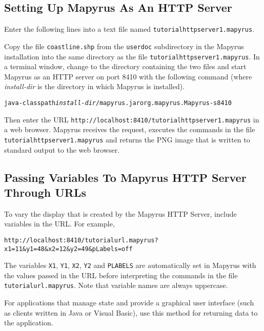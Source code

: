 \subsection{Setting Up Mapyrus As An HTTP Server}
\label{tutorialhttpserver}

Enter the following lines into a text file named
\texttt{tutorialhttpserver1.mapyrus}.



Copy the file \texttt{coastline.shp} from the \texttt{userdoc}
subdirectory in the
Mapyrus installation into the same directory as the file
\texttt{tutorialhttpserver1.mapyrus}.  In a terminal window, change to the
directory containing the two files and start Mapyrus as an HTTP server on port
8410 with the following command
(where \textit{install-dir} is the directory in which Mapyrus is installed).

\begin{alltt}
java -classpath \textit{install-dir}/mapyrus.jar org.mapyrus.Mapyrus -s 8410
\end{alltt}

Then enter the URL \texttt{http://localhost:8410/tutorialhttpserver1.mapyrus} in a
web browser.  Mapyrus receives the request, executes the commands in the file
\texttt{tutorialhttpserver1.mapyrus} and returns the PNG image that is written to
standard output to the web browser.

\subsection{Passing Variables To Mapyrus HTTP Server Through URLs}

To vary the display that is created by the Mapyrus HTTP Server, include
variables in the URL.  For example,

\begin{verbatim}
http://localhost:8410/tutorialurl.mapyrus?x1=11&y1=48&x2=12&y2=49&pLabels=off
\end{verbatim}

The variables \texttt{X1}, \texttt{Y1}, \texttt{X2}, \texttt{Y2}
and \texttt{PLABELS} are automatically set in Mapyrus with the values
passed in the URL before interpreting
the commands in the file \texttt{tutorialurl.mapyrus}.
Note that variable names are always uppercase.

For applications that manage state
and provide a graphical user interface (such as clients written in
Java or Visual Basic), use this method for returning data to the
application.

